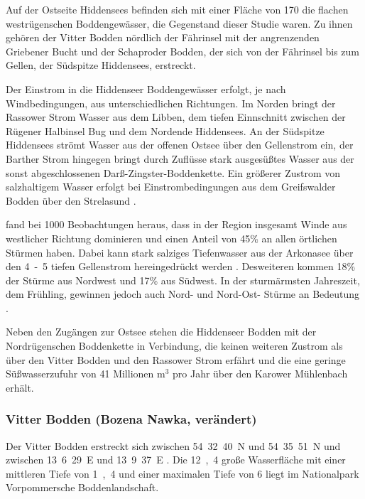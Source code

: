 Auf der Ostseite Hiddensees befinden sich mit einer Fläche von \unit{170}{\kilo\metre\squared} die flachen westrügenschen Boddengewässer, die Gegenstand dieser Studie waren. Zu ihnen gehören der Vitter Bodden nördlich der Fährinsel mit der angrenzenden Griebener Bucht und der Schaproder Bodden, der sich von der Fährinsel bis zum Gellen, der Südspitze Hiddensees, erstreckt.

Der Einstrom in die Hiddenseer Boddengewässer erfolgt, je nach Windbedingungen, aus unterschiedlichen Richtungen. Im Norden bringt der Rassower Strom Wasser aus dem Libben, dem tiefen Einnschnitt zwischen der Rügener Halbinsel Bug und dem Nordende Hiddensees. An der Südspitze Hiddensees strömt Wasser aus der offenen Ostsee über den Gellenstrom ein, der Barther Strom hingegen bringt durch Zuflüsse stark ausgesüßtes Wasser aus der sonst abgeschlossenen Darß-Zingster-Boddenkette. Ein größerer Zustrom von salzhaltigem Wasser erfolgt bei Einstrombedingungen aus dem Greifswalder Bodden über den Strelasund \citep{leps_1933}.

\cite{hartnack_1926} fand bei 1000 Beobachtungen heraus, dass in der Region insgesamt Winde aus westlicher Richtung dominieren und einen Anteil von \unit{45}{\%} an allen örtlichen Stürmen haben. Dabei kann stark salziges Tiefenwasser aus der Arkonasee über den \unit{4-5}{\metre} tiefen Gellenstrom hereingedrückt werden \citep{leps_1933}. Desweiteren kommen \unit{18}{\%} der Stürme aus Nordwest und \unit{17}{\%} aus Südwest. In der sturmärmsten Jahreszeit, dem Frühling, gewinnen jedoch auch Nord- und Nord-Ost- Stürme an Bedeutung \citep{hartnack_1926}.

Neben den Zugängen zur Ostsee stehen die Hiddenseer Bodden mit der Nordrügenschen Boddenkette in Verbindung, die keinen weiteren Zustrom als über den Vitter Bodden und den Rassower Strom erfährt und die eine geringe Süßwasserzufuhr von 41 Millionen m$^3$ pro Jahr über den Karower Mühlenbach erhält.



\subsubsection{Vitter Bodden (Bozena Nawka, verändert)}


Der Vitter Bodden erstreckt sich zwischen 54\textdegree\ 32\textquotesingle\ 40\dq\ N und 54\textdegree\ 35\textquotesingle\ 51\dq\ N und zwischen 13\textdegree\ 6\textquotesingle\ 29\dq\ E und 13\textdegree\ 9\textquotesingle\ 37\dq\ E \citep{nathansen_2014}. Die \unit{12,4}{\kilo\metre\squared} große Wasserfläche mit einer mittleren Tiefe von \unit{1,4}{\metre} \citep{correns_1976} und einer maximalen Tiefe von \unit{6}{\metre} \citep{biele_1997} liegt im Nationalpark Vorpommersche Boddenlandschaft.

